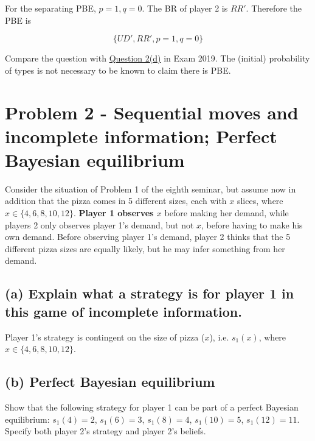\documentclass{article}
\begin{document}
For the separating PBE, $p=1,q=0$. The BR of player 2 is
$RR'$. Therefore the PBE is

$$\{UD',RR',p=1,q=0\}$$


\begin{mdframed}[backgroundcolor=blue!20,linecolor=white]
Compare the question with \href{https://www.uio.no/studier/emner/sv/oekonomi/ECON4220/previous-exams/econ32_4220_2019h_sensorveiledning.pdf}{Question 2(d)} in Exam 2019. The (initial) probability of types is not necessary to be known to claim there is PBE.
\end{mdframed}

\section{Problem 2 - Sequential moves and incomplete information; Perfect
Bayesian equilibrium}

Consider the situation of Problem 1 of the eighth seminar, but assume now in addition that the pizza comes in 5
different sizes, each with $x$ slices, where $x \in \{4, 6, 8, 10, 12\}$. \textbf{Player 1 observes $x$}
before making her demand, while players 2 only observes player 1's demand, but not $x$, before
having to make his own demand. Before observing player 1's demand, player 2 thinks that the 5
different pizza sizes are equally likely, but he may infer something from her demand.
%

%
\subsection*{(a) Explain what a strategy is for player 1 in this game of incomplete information.} 
%
Player 1's strategy is contingent on the size of pizza ($x$), i.e. $s_1(x)$, 
where $x \in \{4, 6, 8, 10, 12\}$.


\subsection*{(b) Perfect Bayesian
equilibrium} Show that the following strategy for player 1 can be part of a perfect Bayesian
equilibrium: $s_1(4) = 2$, $s_1(6) = 3$, $s_1(8) = 4$, $s_1(10) = 5$, $s_1(12) = 11$. Specify
both player 2's strategy and player 2's beliefs. 
%
\bigskip
\end{document}
